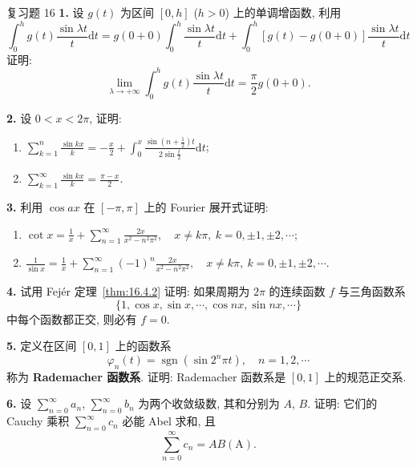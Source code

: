 
\begin{exblock}{复习题 16}
\textbf{1.} 设 $g(t)$ 为区间 $[0,h]$ ($h>0$) 上的单调增函数, 利用
\[
  \int_{0}^{h}g(t)\frac{\sin\lambda t}{t}\mathrm{d}t=g(0+0)\int_{0}^{h}\frac{\sin\lambda t}{t}\mathrm{d}t+\int_{0}^{h}\left[g(t)-g(0+0)\right]\frac{\sin\lambda t}{t}\mathrm{d}t
\]
证明:
\[
  \lim_{\lambda\to+\infty}\int_{0}^{h}g(t)\frac{\sin\lambda t}{t}\mathrm{d}t=\frac{\pi}{2}g(0+0).
\]

\textbf{2.} 设 $0<x<2\pi$, 证明:
\begin{enumerate}
\item $\displaystyle\sum_{k=1}^{n}\frac{\sin kx}{k}=-\frac{x}{2}+\int_{0}^{x}\frac{\sin\left(n+\frac{1}{2}\right)t}{2\sin\frac{t}{2}}\mathrm{d}t$;
\item $\displaystyle\sum_{k=1}^{\infty}\frac{\sin kx}{k}=\frac{\pi-x}{2}$.
\end{enumerate}

\textbf{3.} 利用 $\cos ax$ 在 $[-\pi,\pi]$ 上的 Fourier 展开式证明:
\begin{enumerate}
\item $\displaystyle\cot x=\frac{1}{x}+\sum_{n=1}^{\infty}\frac{2x}{x^{2}-n^{2}\pi^{2}},\quad x\neq k\pi,\ k=0,\pm1,\pm2,\cdots$;
\item $\displaystyle\frac{1}{\sin x}=\frac{1}{x}+\sum_{n=1}^{\infty}(-1)^{n}\frac{2x}{x^{2}-n^{2}\pi^{2}},\quad x\neq k\pi,\ k=0,\pm1,\pm2,\cdots$.
\end{enumerate}

\textbf{4.} 试用 Fej\'er 定理~\ref{thm:16.4.2} 证明: 如果周期为 $2\pi$ 的连续函数 $f$ 与三角函数系
\[
  \{1,\cos x,\sin x,\cdots,\cos nx,\sin nx,\cdots\}
\]
中每个函数都正交, 则必有 $f=0$.

\textbf{5.} 定义在区间 $[0,1]$ 上的函数系
\[
  \varphi_{n}(t)=\operatorname{sgn}(\sin 2^{n}\pi t),\quad n=1,2,\cdots
\]
称为 \textbf{Rademacher 函数系}. 证明: Rademacher 函数系是 $[0,1]$ 上的规范正交系.

\textbf{6.} 设 $\displaystyle\sum_{n=0}^{\infty}a_{n}$, $\displaystyle\sum_{n=0}^{\infty}b_{n}$ 为两个收敛级数, 其和分别为 $A$, $B$. 证明: 它们的 Cauchy 乘积 $\displaystyle\sum_{n=0}^{\infty}c_{n}$ 必能 Abel 求和, 且
\[
  \sum_{n=0}^{\infty}c_{n}=AB(\mathrm{A}).
\]


\end{exblock}
